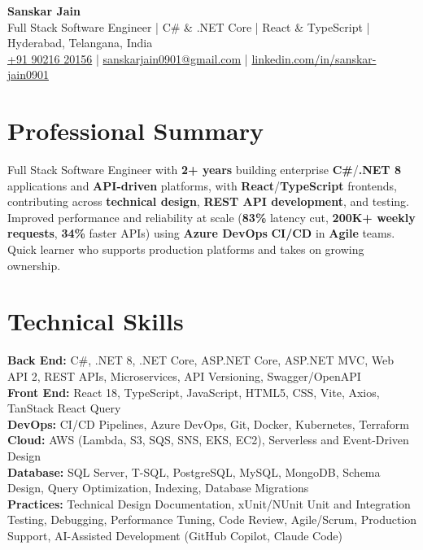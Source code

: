 \documentclass[a4paper,10pt]{article}
\begin{document}
\begin{center}
    {\LARGE \textbf{Sanskar Jain}} \\
    \vspace{2pt}
    Full Stack Software Engineer \;|\; C\# \& .NET Core \;|\; React \& TypeScript \;|\; Hyderabad, Telangana, India \\
    \vspace{2pt}
    \href{tel:+919021620156}{+91 90216 20156} \;|\;
    \href{mailto:sanskarjain0901@gmail.com}{sanskarjain0901@gmail.com} \;|\;
    \href{https://www.linkedin.com/in/sanskar-jain0901/}{linkedin.com/in/sanskar-jain0901}
\end{center}

\section*{Professional Summary}
Full Stack Software Engineer with \textbf{2+ years} building enterprise \textbf{C\#}/\textbf{.NET 8} applications and \textbf{API-driven} platforms, with \textbf{React}/\textbf{TypeScript} frontends, contributing across \textbf{technical design}, \textbf{REST API development}, and testing.
Improved performance and reliability at scale (\textbf{83\%} latency cut, \textbf{200K+ weekly requests}, \textbf{34\%} faster APIs) using \textbf{Azure DevOps} \textbf{CI/CD} in \textbf{Agile} teams.
Quick learner who supports production platforms and takes on growing ownership.

\section*{Technical Skills}
\begin{sloppypar}
\noindent
\textbf{Back End:} C\#, .NET 8, .NET Core, ASP.NET Core, ASP.NET MVC, Web API 2, REST APIs, Microservices, API Versioning, Swagger/OpenAPI \\
\textbf{Front End:} React 18, TypeScript, JavaScript, HTML5, CSS, Vite, Axios, TanStack React Query \\
\textbf{DevOps:} CI/CD Pipelines, Azure DevOps, Git, Docker, Kubernetes, Terraform \\
\textbf{Cloud:} AWS (Lambda, S3, SQS, SNS, EKS, EC2), Serverless and Event-Driven Design \\
\textbf{Database:} SQL Server, T-SQL, PostgreSQL, MySQL, MongoDB, Schema Design, Query Optimization, Indexing, Database Migrations \\
\textbf{Practices:} Technical Design Documentation, xUnit/NUnit Unit and Integration Testing, Debugging, Performance Tuning, Code Review, Agile/Scrum, Production Support, AI-Assisted Development (GitHub Copilot, Claude Code)
\end{sloppypar}
\end{document}
